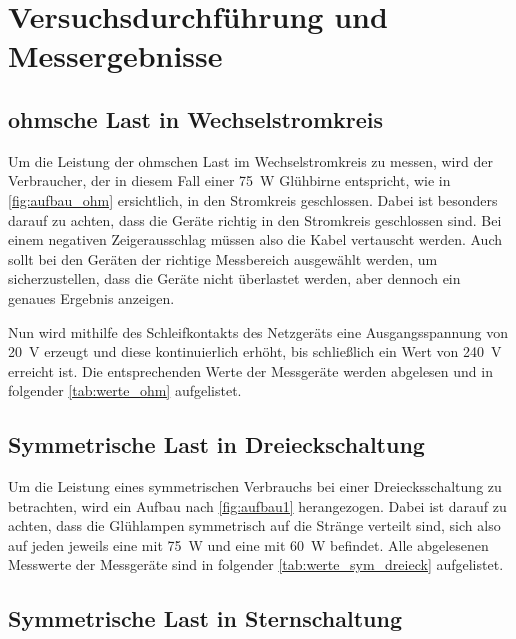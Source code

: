 \documentclass[12pt,english,ngerman]{scrartcl}
\begin{document}
\section{Versuchsdurchführung und Messergebnisse}
\label{sec:versuchsdurchfuehrung_messergebnisse}

\subsection{ohmsche Last in Wechselstromkreis}

Um die Leistung der ohmschen Last im Wechselstromkreis zu messen, wird der Verbraucher, der in diesem Fall einer \SI[]{75}{\watt} 
Glühbirne entspricht, wie in \autoref{fig:aufbau_ohm} ersichtlich, in den Stromkreis geschlossen. Dabei ist besonders darauf 
zu achten, dass die Geräte richtig in den Stromkreis geschlossen sind. Bei einem negativen Zeigerausschlag müssen also die Kabel 
vertauscht werden. Auch sollt bei den Geräten der richtige Messbereich ausgewählt werden, um sicherzustellen, dass die Geräte 
nicht überlastet werden, aber dennoch ein genaues Ergebnis anzeigen. 

Nun wird mithilfe des Schleifkontakts des Netzgeräts eine Ausgangsspannung von \SI[]{20}{\volt} erzeugt und diese kontinuierlich
erhöht, bis schließlich ein Wert von \SI[]{240}{\volt} erreicht ist.
Die entsprechenden Werte der Messgeräte werden abgelesen und in folgender \autoref{tab:werte_ohm} aufgelistet.



\subsection{Symmetrische Last in Dreieckschaltung}

Um die Leistung eines symmetrischen Verbrauchs bei einer Dreiecksschaltung zu betrachten, wird ein Aufbau nach \autoref{fig:aufbau1}
herangezogen. Dabei ist darauf zu achten, dass die Glühlampen symmetrisch auf die Stränge verteilt sind, sich also auf jeden 
jeweils eine mit \SI[]{75}{\watt} und eine mit  \SI[]{60}{\watt} befindet.
Alle abgelesenen Messwerte der Messgeräte sind in folgender \autoref{tab:werte_sym_dreieck} aufgelistet.



\subsection{Symmetrische Last in Sternschaltung}
\end{document}
